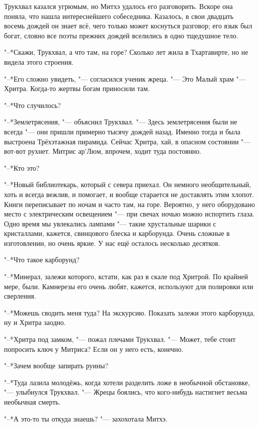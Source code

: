 \documentclass[a4paper,10pt]{book}
\begin{document}
Трукхвал казался угрюмым, но Митхэ удалось его разговорить. Вскоре она поняла, 
что нашла интереснейшего собеседника. Казалось, в свои двадцать восемь дождей 
он 
знает всё, чего только может 
коснуться разговор; его язык был богат, словно все поэты прежних дождей 
вселились в одно тщедушное тело.

"--*Скажи, Трукхвал, а что там, на горе? Сколько лет жила в Тхартавирте, но не 
видела
этого строения.

"--*Его сложно увидеть, "--- согласился ученик жреца. "--- Это Малый храм "--- 
Хритра. Когда-то жертвы богам приносили там.

"--*Что случилось?

"--*Землетрясения, "--- объяснил Трукхвал. "--- Здесь землетрясения были не 
всегда "--- они пришли примерно тысячу дождей назад. Именно тогда и была 
выстроена Трёхэтажная пирамида. Сейчас Хритра, хай, в опасном состоянии "--- 
вот-вот рухнет. Митрис ар'Люм, впрочем, ходит туда постоянно.

"--*Кто это?

"--*Новый библиотекарь, который с севера приехал. Он немного необщительный, 
хоть и всегда вежлив, и помогает, и вообще старается не доставлять этим хлопот. 
Книги переписывает по ночам и часто там, на горе. Вероятно, у него оборудовано 
место с электрическим освещением "--- при свечах ночью можно испортить глаза. 
Одно время мы увлекались лампами "--- такие хрустальные шарики с кристаллами, 
кажется, свинцового блеска и карборунда. Очень сложные в изготовлении, но очень 
яркие. У нас ещё осталось несколько десятков.

"--*Что такое карборунд?

"--*Минерал, залежи которого, кстати, как раз в скале под Хритрой. По крайней 
мере, были. Камнерезы его очень любят, кажется, используют для полировки или
сверления.

"--*Можешь сводить меня туда? На экскурсию. Показать залежи этого карборунда,
ну и Хритра заодно.

"--*Хритра под замком, "--- пожал плечами Трукхвал. "--- Может, тебе стоит 
попросить ключ у Митриса? Если он у него есть, конечно.

"--*Зачем вообще запирать руины?

"--*Туда лазила молодёжь, когда хотели разделить ложе в необычной обстановке, 
"--- улыбнулся Трукхвал.
"--- Жрецы боялись, что кого-нибудь настигнет весьма необычная смерть.

"--*А это-то ты откуда знаешь? "--- захохотала Митхэ.
\end{document}

